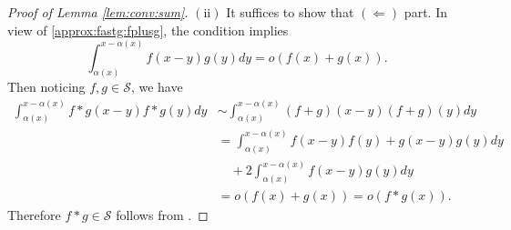 \documentclass[12pt,leqno]{amsart}
\newcommand{\cals}{{\mathcal S}}
\newcommand{\call}{{\mathcal L}}
\newcommand{\1}{{\mathbf 1}}
\begin{document}
\begin{proof}[Proof of Lemma \ref{lem:conv:sum}]
\noindent 
 $(\mathrm{ii})$ It suffices to show that $(\Leftarrow)$ part. 
In view of \eqref{approx:fastg:fplusg}, the condition implies 
\[
\int_{\alpha(x)}^{x-\alpha(x)} f(x-y)g(y)dy =o(f(x)+g(x)).  
\]
Then noticing $f,g\in \cals$, we have 
\begin{align*}
 \int_{\alpha(x)}^{x-\alpha(x)} f\ast g(x-y) f\ast g (y)dy
&\sim \int_{\alpha(x)}^{x-\alpha(x)} (f+ g)(x-y) (f+ g) (y)dy\\
&= \int_{\alpha(x)}^{x-\alpha(x)} f(x-y)f(y)+g(x-y)g(y)dy \\
&\quad + 2 \int_{\alpha(x)}^{x-\alpha(x)} f(x-y)g(y)dy \\
&= o(f(x)+g(x))=o(f\ast g(x)).
\end{align*}
Therefore $f\ast g\in\cals$ follows from \cite[Theorem 4.7]{Foss:Korshunov:Zachary:2013}. 

\end{proof}
\end{document}
